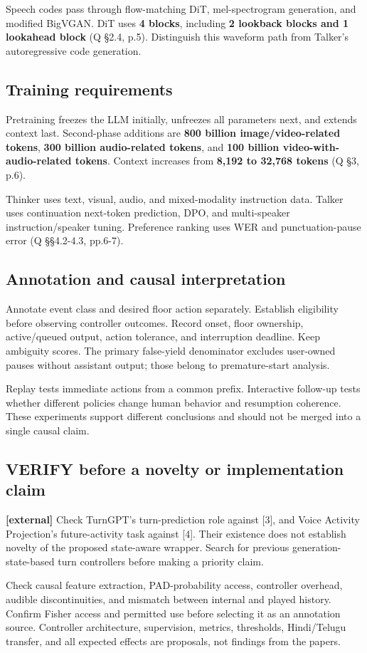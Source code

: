 \documentclass[11pt]{article}
\begin{document}
Speech codes pass through flow-matching DiT, mel-spectrogram generation, and modified BigVGAN. DiT uses \textbf{4 blocks}, including \textbf{2 lookback blocks and 1 lookahead block} (Q §2.4, p.5). Distinguish this waveform path from Talker's autoregressive code generation.

\subsection*{Training requirements}

Pretraining freezes the LLM initially, unfreezes all parameters next, and extends context last. Second-phase additions are \textbf{800 billion image/video-related tokens}, \textbf{300 billion audio-related tokens}, and \textbf{100 billion video-with-audio-related tokens}. Context increases from \textbf{8,192 to 32,768 tokens} (Q §3, p.6).

Thinker uses text, visual, audio, and mixed-modality instruction data. Talker uses continuation next-token prediction, DPO, and multi-speaker instruction/speaker tuning. Preference ranking uses WER and punctuation-pause error (Q §§4.2-4.3, pp.6-7).

\subsection*{Annotation and causal interpretation}

Annotate event class and desired floor action separately. Establish eligibility before observing controller outcomes. Record onset, floor ownership, active/queued output, action tolerance, and interruption deadline. Keep ambiguity scores. The primary false-yield denominator excludes user-owned pauses without assistant output; those belong to premature-start analysis.

Replay tests immediate actions from a common prefix. Interactive follow-up tests whether different policies change human behavior and resumption coherence. These experiments support different conclusions and should not be merged into a single causal claim.

\subsection*{VERIFY before a novelty or implementation claim}

\textbf{[external]} Check TurnGPT's turn-prediction role against [3], and Voice Activity Projection's future-activity task against [4]. Their existence does not establish novelty of the proposed state-aware wrapper. Search for previous generation-state-based turn controllers before making a priority claim.

Check causal feature extraction, PAD-probability access, controller overhead, audible discontinuities, and mismatch between internal and played history. Confirm Fisher access and permitted use before selecting it as an annotation source. Controller architecture, supervision, metrics, thresholds, Hindi/Telugu transfer, and all expected effects are proposals, not findings from the papers.
\end{document}
